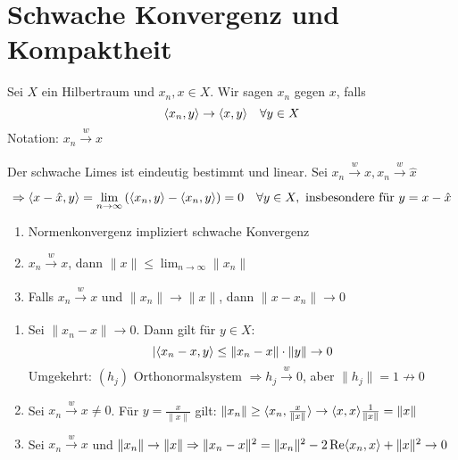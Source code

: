 


\section{Schwache Konvergenz und Kompaktheit}


\begin{definition}
	Sei $X$ ein Hilbertraum und $x_{n}, x \in X$. Wir sagen $x_{n}$  gegen $x$, falls
		\[ \langle x_{n} , y \rangle \rightarrow \langle x , y \rangle \quad \forall y \in X \]
	Notation: $x_{n} \xrightarrow[]{w} x$	
\end{definition}


\begin{bemerkung}
	Der schwache Limes ist eindeutig bestimmt und linear. Sei $x_{n} \xrightarrow[]{w} x, x_{n} \xrightarrow[]{w} \hat{x}$
		\[ \Rightarrow \langle x - \hat{x} , y \rangle = \lim_{n \rightarrow \infty} \left( \langle x_{n} , y \rangle - \langle x_{n} , y \rangle \right) = 0 \quad \forall y \in X, \text{ insbesondere für } y = x - \hat{x} \]	
\end{bemerkung}


\begin{prop} \label{prop:18.3}
	\begin{enumerate}[label=\alph*\upshape)]
		\item Normenkonvergenz impliziert schwache Konvergenz
		\item $x_{n} \xrightarrow[]{w} x$, dann $\| x \| \leq \lim_{n \rightarrow \infty} \| x_{n} \|$
		\item Falls $x_{n} \xrightarrow[]{w} x$ und $\| x_{n} \| \rightarrow \| x \|$, dann $\| x - x_{n} \| \rightarrow 0$
	\end{enumerate}
\end{prop}

\begin{beweis}
	\begin{enumerate}[label=\alph*\upshape)]
		\item Sei $\| x_{n} - x \| \rightarrow 0$. Dann gilt für $y \in X$:
			\[ |\langle x_{n} - x , y \rangle \leq \| x_{n} - x \| \cdot \| y \| \rightarrow 0 \]
			Umgekehrt: $(h_{j})$ Orthonormalsystem $\Rightarrow h_{j} \xrightarrow[]{w} 0$, aber $\| h_{j} \| = 1 \not\rightarrow 0$
		\item Sei $x_{n} \xrightarrow[]{w} x \neq 0$. Für $y = \frac{x}{\| x \|}$ gilt: $\| x_{n} \| \geq \langle x_{n} , \frac{x}{\| x \|} \rangle \rightarrow \langle x , x \rangle \frac{1}{\| x \|} = \| x \|$
		\item Sei $x_{n} \xrightarrow[]{w} x$ und $\| x_{n} \| \rightarrow \| x \| \Rightarrow \| x_{n} - x \|^{2} = \| x_{n} \|^{2} - 2 \mathop{\rm Re}\nolimits \langle x_{n} , x \rangle + \| x \|^{2} \rightarrow 0$
	\end{enumerate}	
\end{beweis}


